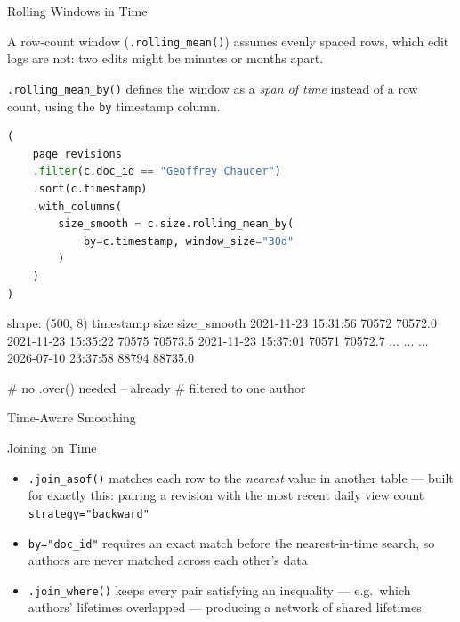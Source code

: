 \documentclass[8pt,aspectratio=169]{beamer}
\begin{document}
\begin{frame}[fragile]{Rolling Windows in Time}
\begin{splitcode}{%

A row-count window (\texttt{.rolling\_mean()}) assumes evenly spaced rows, which edit logs are not: two edits might be minutes or months apart.

\texttt{.rolling\_mean\_by()} defines the window as a \textit{span of time} instead of a row count, using the \texttt{by} timestamp column.

}
\begin{lstlisting}[language=Python]
(
    page_revisions
    .filter(c.doc_id == "Geoffrey Chaucer")
    .sort(c.timestamp)
    .with_columns(
        size_smooth = c.size.rolling_mean_by(
            by=c.timestamp, window_size="30d"
        )
    )
)
\end{lstlisting}
\begin{codeoutput}
shape: (500, 8)
timestamp            size   size_smooth
2021-11-23 15:31:56  70572  70572.0
2021-11-23 15:35:22  70575  70573.5
2021-11-23 15:37:01  70571  70572.7
...                  ...    ...
2026-07-10 23:37:58  88794  88735.0

# no .over() needed -- already
# filtered to one author
\end{codeoutput}
\end{splitcode}
\end{frame}

\begin{rightframe}{Time-Aware Smoothing}
\end{rightframe}

\begin{textframe}{Joining on Time}

\begin{itemize}
\item \texttt{.join\_asof()} matches each row to the \textit{nearest} value in another table --- built for exactly this: pairing a revision with the most recent daily view count \texttt{strategy="backward"}
\item \texttt{by="doc\_id"} requires an exact match before the nearest-in-time search, so authors are never matched across each other's data
\item \texttt{.join\_where()} keeps every pair satisfying an inequality --- e.g.\ which authors' lifetimes overlapped --- producing a network of shared lifetimes
\end{itemize}

\end{textframe}
\end{document}
